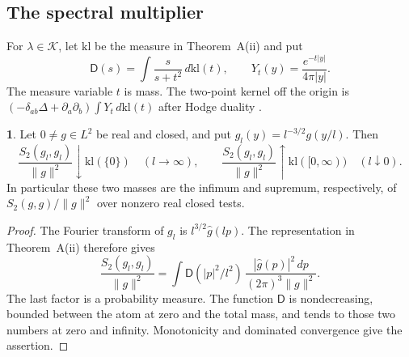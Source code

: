 \documentclass[11pt]{amsart}
\newcommand{\namedhead}{}
\theoremstyle{definition}
\newtheorem*{namedinner}{\namedhead}
\newenvironment{named}[1]{\renewcommand{\namedhead}{#1}\begin{namedinner}}{\end{namedinner}}
\begin{document}
\subsection{The spectral multiplier}
For $\lambda\in\mathcal K$, let $\mathrm{kl}$ be the measure in
Theorem~A(ii) and put
\[
\mathsf D(s)=\int\frac{s}{s+t^2}\,d\mathrm{kl}(t),\qquad
Y_t(y)=\frac{e^{-t|y|}}{4\pi|y|}.
\]
The measure variable $t$ is mass. The two-point kernel off the origin is
$(-\delta_{ab}\Delta+\partial_a\partial_b)\int Y_t\,\allowbreak d\mathrm{kl}(t)$
after Hodge duality \cite[Theorem~14.26]{QEDII}.
\begin{named}{Proposition 4.1}
Let $0\ne g\in L^2$ be real and closed, and put
$g_l(y)=l^{-3/2}g(y/l)$. Then
\[
\frac{S_2(g_l,g_l)}{\|g\|^2}\downarrow\mathrm{kl}(\{0\})
\quad(l\to\infty),\qquad
\frac{S_2(g_l,g_l)}{\|g\|^2}\uparrow\mathrm{kl}([0,\infty))
\quad(l\downarrow0).
\]
In particular these two masses are the infimum and supremum,
respectively, of $S_2(g,g)/\|g\|^2$ over nonzero real closed tests.
\end{named}
\begin{proof}
The Fourier transform of $g_l$ is $l^{3/2}\hat g(lp)$.
The representation in Theorem~A(ii) therefore gives
\[
\frac{S_2(g_l,g_l)}{\|g\|^2}
=\int\mathsf D(|p|^2/l^2)\,
\frac{|\hat g(p)|^2\,dp}{(2\pi)^3\|g\|^2}.
\]
The last factor is a probability measure. The function $\mathsf D$ is
nondecreasing, bounded between the atom at zero and the total mass,
and tends to those two numbers at zero and infinity. Monotonicity
and dominated convergence give the assertion.

\end{proof}
\end{document}
